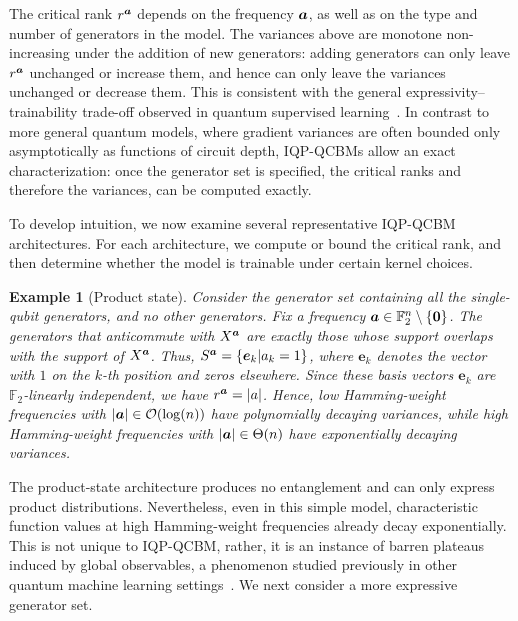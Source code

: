 \documentclass{article}
\theoremstyle{plain}
\newtheorem{example}[theorem]{Example}
\theoremstyle{definition}
\theoremstyle{remark}
\begin{document}
The critical rank $r^{\bm{a}}$ depends on the frequency ${\bm{a}}$, as well as on the type and number of generators in the model. The variances above are monotone non-increasing under the addition of new generators: adding generators can only leave $r^{\bm{a}}$ unchanged or increase them, and hence can only leave the variances unchanged or decrease them. This is consistent with the general expressivity–trainability trade-off observed in quantum supervised learning~\citet{mcclean18, Holmes22}. In contrast to more general quantum models, where gradient variances are often bounded only asymptotically as functions of circuit depth, IQP-QCBMs allow an exact characterization: once the generator set is specified, the critical ranks and therefore the variances, can be computed exactly.

To develop intuition, we now examine several representative IQP-QCBM architectures. For each architecture, we compute or bound the critical rank, and then determine whether the model is trainable under certain kernel choices.

\begin{example}[Product state]
\label{eg:product}
Consider the generator set containing all the single-qubit generators, and no other generators. Fix a frequency ${\bm{a}} \in \mathbb{F}_2^n \setminus \{\bm{0}\}$. The generators that anticommute with $X^{\bm{a}}$ are exactly those whose support overlaps with the support of $X^{\bm{a}}$. Thus, $S^{\bm{a}}=\{\bm{e}_k|a_k=1\}$, where $\bm{e}_k$ denotes the vector with $1$ on the $k$-th position and zeros elsewhere. Since these basis vectors $\bm{e}_k$ are $\mathbb{F}_2$-linearly independent, we have $r^{\bm{a}} = \abs{a}$. Hence, low Hamming-weight frequencies with $\abs{{\bm{a}}} \in \mathcal{O}(\log(n))$ have polynomially decaying variances, while high Hamming-weight frequencies with $\abs{{\bm{a}}} \in \Theta(n)$ have exponentially decaying variances. 
\end{example}

The product-state architecture produces no entanglement and can only express product distributions. Nevertheless, even in this simple model, characteristic function values at high Hamming-weight frequencies already decay exponentially. This is not unique to IQP-QCBM, rather, it is an instance of barren plateaus induced by global observables, a phenomenon studied previously in other quantum machine learning settings~\citet{Cerezo21,rudolph24}. We next consider a more expressive generator set.
\end{document}
